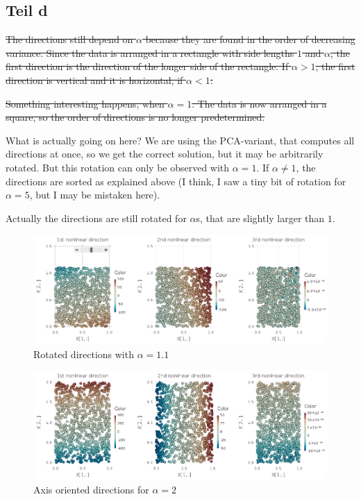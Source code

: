 \documentclass[10pt,a4paper]{article}
\begin{document}
\subsection{Teil d}

\sout{
The directions still depend on $\alpha$ because they are found in the order of
decreasing variance. Since the data is arranged in a rectangle with side lengths
$1$ and $\alpha$, the first direction is the direction of the longer side of the
rectangle. If $\alpha > 1$, the first direction is vertical and it is
horizontal, if $\alpha < 1$.}

\sout{
Something interesting happens, when $\alpha = 1$. The data is now arranged in a
square, so the order of directions is no longer predetermined.
}

What is actually going on here? We are using the PCA-variant, that computes all
directions at once, so we get the correct solution, but it may be arbitrarily
rotated. But this rotation can only be observed with $\alpha = 1$. If
$\alpha \ne 1$, the directions are sorted as explained above (I think, I saw a
tiny bit of rotation for $\alpha = 5$, but I may be mistaken here).

Actually the directions are still rotated for $\alpha$s, that are slightly
larger than $1$.
\begin{figure}[ht!]
  \centering
  \includegraphics[width=350pt]{7_2_d_rotated}
  \caption{Rotated directions with $\alpha = 1.1$}
\end{figure}
\begin{figure}[ht!]
  \centering
  \includegraphics[width=350pt]{7_2_d_straight}
  \caption{Axis oriented directions for $\alpha = 2$}
\end{figure}
\end{document}
